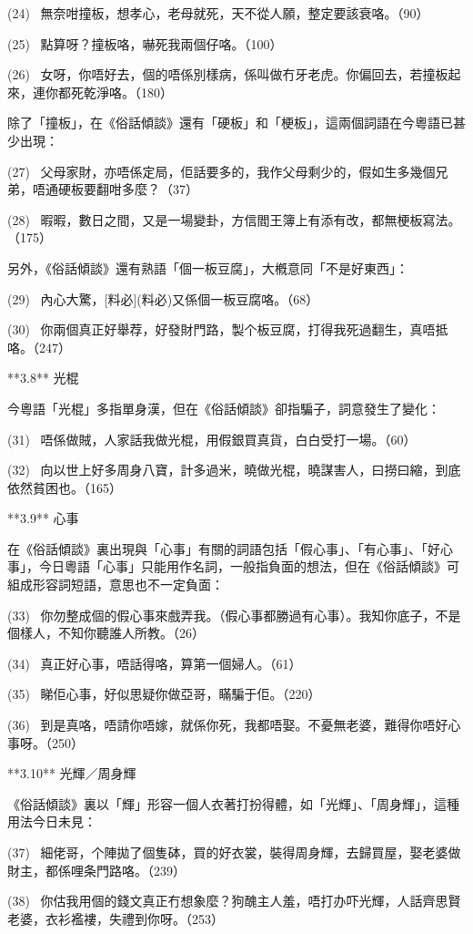 (24)  無奈咁撞板，想孝心，老母就死，天不從人願，整定要該衰咯。（90）

(25)  點算呀？撞板咯，嚇死我兩個仔咯。（100）

(26)  女呀，你唔好去，個的唔係別樣病，係叫做冇牙老虎。你偏回去，若撞板起來，連你都死乾淨咯。（180）

除了「撞板」，在《俗話傾談》還有「硬板」和「梗板」，這兩個詞語在今粵語已甚少出現：

(27)  父母家財，亦唔係定局，佢話要多的，我作父母剩少的，假如生多幾個兄弟，唔通硬板要翻咁多麼？（37）

(28)  暇暇，數日之間，又是一場變卦，方信閻王簿上有添有改，都無梗板寫法。（175）

另外，《俗話傾談》還有熟語「個一板豆腐」，大槪意同「不是好東西」：

(29)  內心大驚，[料必](料必)又係個一板豆腐咯。（68）

(30)  你兩個真正好舉荐，好發財門路，製个板豆腐，打得我死過翻生，真唔抵咯。（247）

**3.8** 光棍

今粵語「光棍」多指單身漢，但在《俗話傾談》卻指騙子，詞意發生了變化：

(31)  唔係做賊，人家話我做光棍，用假銀買真貨，白白受打一場。（60）

(32)  向以世上好多周身八寶，計多過米，曉做光棍，曉謀害人，曰撈曰縮，到底依然貧困也。（165）

**3.9** 心事

在《俗話傾談》裏出現與「心事」有關的詞語包括「假心事」、「有心事」、「好心事」，今日粵語「心事」只能用作名詞，一般指負面的想法，但在《俗話傾談》可組成形容詞短語，意思也不一定負面：

(33)  你勿整成個的假心事來戲弄我。（假心事都勝過有心事）。我知你底子，不是個樣人，不知你聽誰人所教。（26）

(34)  真正好心事，唔話得咯，算第一個婦人。（61）

(35)  睇佢心事，好似思疑你做亞哥，瞞騙于佢。（220）

(36)  到是真咯，唔請你唔嫁，就係你死，我都唔娶。不憂無老婆，難得你唔好心事呀。（250）

**3.10** 光輝／周身輝

《俗話傾談》裏以「輝」形容一個人衣著打扮得體，如「光輝」、「周身輝」，這種用法今日未見：

(37)  細佬哥，个陣拋了個隻砵，買的好衣裳，裝得周身輝，去歸買屋，娶老婆做財主，都係哩条門路咯。（239）

(38)  你估我用個的錢文真正冇想象麼？狗醜主人羞，唔打办吓光輝，人話齊思賢老婆，衣衫襤褸，失禮到你呀。（253）

